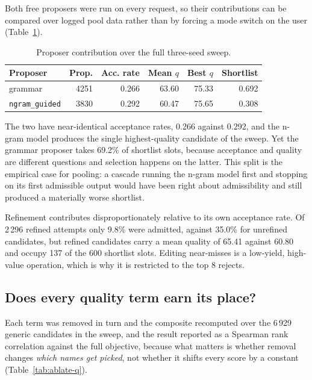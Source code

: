 \documentclass[conference]{IEEEtran}
\newcommand{\code}[1]{\texttt{\footnotesize #1}}
\begin{document}
Both free proposers were run on every request, so their contributions can be
compared over logged pool data rather than by forcing a mode switch on the user
(Table~\ref{tab:proposer}).

\begin{table}[t]
\caption{Proposer contribution over the full three-seed sweep.}
\label{tab:proposer}
\centering
\footnotesize
\begin{tabular}{lrrrrr}
\toprule
Proposer & Prop. & Acc. rate & Mean $q$ & Best $q$ & Shortlist \\
\midrule
grammar            & 4251 & 0.266 & 63.60 & 75.33 & 0.692 \\
\code{ngram\_guided}& 3830 & 0.292 & 60.47 & 75.65 & 0.308 \\
\bottomrule
\end{tabular}
\end{table}

The two have near-identical acceptance rates, 0.266 against 0.292, and the
n-gram model produces the single highest-quality candidate of the sweep. Yet the
grammar proposer takes 69.2\% of shortlist slots, because acceptance and quality
are different questions and selection happens on the latter. This split is the
empirical case for pooling: a cascade running the n-gram model first and
stopping on its first admissible output would have been right about
admissibility and still produced a materially worse shortlist.

Refinement contributes disproportionately relative to its own acceptance rate.
Of 2\,296 refined attempts only 9.8\% were admitted, against 35.0\% for unrefined
candidates, but refined candidates carry a mean quality of 65.41 against 60.80
and occupy 137 of the 600 shortlist slots. Editing near-misses is a low-yield,
high-value operation, which is why it is restricted to the top 8 rejects.

\subsection{Does every quality term earn its place?}

Each term was removed in turn and the composite recomputed over the 6\,929
generic candidates in the sweep, and the result reported as a Spearman rank
correlation against the full objective, because what matters is whether removal
changes \emph{which names get picked}, not whether it shifts every score by a
constant (Table~\ref{tab:ablate-q}).
\end{document}
